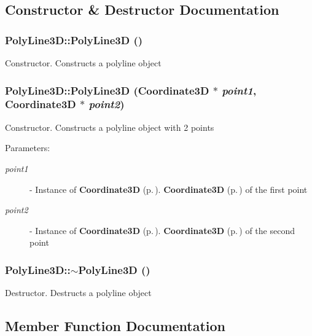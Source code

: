 \subsection{Constructor \& Destructor Documentation}
\subsubsection{\setlength{\rightskip}{0pt plus 5cm}Poly\-Line3D::Poly\-Line3D ()}\label{classPolyLine3D_a0}


Constructor. Constructs a polyline object 
\subsubsection{\setlength{\rightskip}{0pt plus 5cm}Poly\-Line3D::Poly\-Line3D ({\bf Coordinate3D} $\ast$ {\em point1}, {\bf Coordinate3D} $\ast$ {\em point2})}\label{classPolyLine3D_a1}


Constructor. Constructs a polyline object with 2 points \begin{Desc}
\item[Parameters: ]\par
\begin{description}
\item[{\em 
point1}]- Instance of {\bf Coordinate3D} {\rm (p.\,\pageref{classCoordinate3D})}. {\bf Coordinate3D} {\rm (p.\,\pageref{classCoordinate3D})} of the first point \item[{\em 
point2}]- Instance of {\bf Coordinate3D} {\rm (p.\,\pageref{classCoordinate3D})}. {\bf Coordinate3D} {\rm (p.\,\pageref{classCoordinate3D})} of the second point \end{description}
\end{Desc}
\subsubsection{\setlength{\rightskip}{0pt plus 5cm}Poly\-Line3D::$\sim$Poly\-Line3D ()}\label{classPolyLine3D_a2}


Destructor. Destructs a polyline object 

\subsection{Member Function Documentation}
